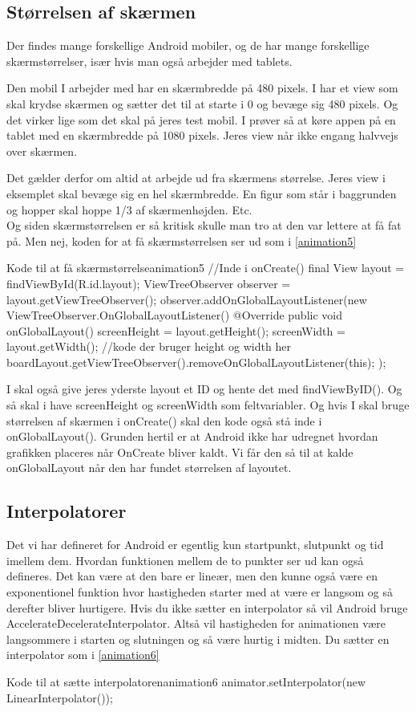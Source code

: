 \subsection{Størrelsen af skærmen}
Der findes mange forskellige Android mobiler, og de har mange forskellige skærmstørrelser, især hvis man også arbejder med tablets. 
\begin{example}
	Den mobil I arbejder med har en skærmbredde på 480 pixels. I har et view som skal krydse skærmen og sætter det til at starte i 0 og bevæge sig 480 pixels. Og det virker lige som det skal på jeres test mobil. I prøver så at køre appen på en tablet med en skærmbredde på 1080 pixels. Jeres view når ikke engang halvvejs over skærmen. 
\end{example}
Det gælder derfor om altid at arbejde ud fra skærmens størrelse. Jeres view i eksemplet skal bevæge sig en hel skærmbredde. En figur som står i baggrunden og hopper skal hoppe 1/3 af skærmenhøjden. Etc.\\

Og siden skærmstørrelsen er så kritisk skulle man tro at den var lettere at få fat på. Men nej, koden for at få skærmstørrelsen ser ud som i \autoref{animation5}
\begin{JavaCode}{Kode til at få skærmstørrelse}{animation5}
	//Inde i onCreate()
	final View layout = findViewById(R.id.layout);
	ViewTreeObserver observer = layout.getViewTreeObserver();
	observer.addOnGlobalLayoutListener(new ViewTreeObserver.OnGlobalLayoutListener() {
		@Override
		public void onGlobalLayout() {
			screenHeight = layout.getHeight();
			screenWidth = layout.getWidth();
			//kode der bruger height og width her
			boardLayout.getViewTreeObserver().removeOnGlobalLayoutListener(this);
		}
	});
\end{JavaCode}

I skal også give jeres yderste layout et ID og hente det med findViewByID(). Og så skal i have screenHeight og screenWidth som feltvariabler. Og hvis I skal bruge størrelsen af skærmen i onCreate() skal den kode også stå inde i onGlobalLayout().
Grunden hertil er at Android ikke har udregnet hvordan grafikken placeres når OnCreate bliver kaldt. Vi får den så til at kalde onGlobalLayout når den har fundet størrelsen af layoutet.
\subsection{Interpolatorer}
Det vi har defineret for Android er egentlig kun startpunkt, slutpunkt og tid imellem dem. Hvordan funktionen mellem de to punkter ser ud kan også defineres. Det kan være at den bare er lineær, men den kunne også være en exponentionel funktion hvor hastigheden starter med at være er langsom og så derefter bliver hurtigere. 
Hvis du ikke sætter en interpolator så vil Android bruge AccelerateDecelerateInterpolator. Altså vil hastigheden for animationen være langsommere i starten og slutningen og så være hurtig i midten. Du sætter en interpolator som i \autoref{animation6}
\begin{JavaCode}{Kode til at sætte interpolatoren}{animation6}
	animator.setInterpolator(new LinearInterpolator());
\end{JavaCode}

